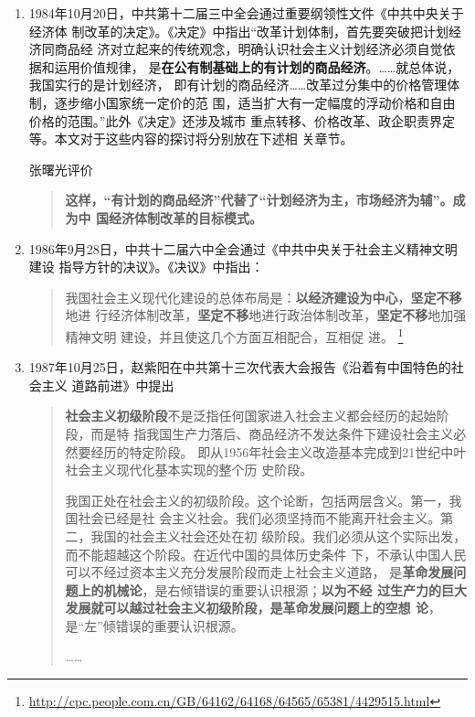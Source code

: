 \begin{enumerate}
\item 1984年10月20日，中共第十二届三中全会通过重要纲领性文件《中共中央关于经济体
  制改革的决定》。《决定》中指出“改革计划体制，首先要突破把计划经济同商品经
  济对立起来的传统观念，明确认识社会主义计划经济必须自觉依据和运用价值规律，
  是\textbf{在公有制基础上的有计划的商品经济}。……就总体说，我国实行的是计划经济，
  即有计划的商品经济……改革过分集中的价格管理体制，逐步缩小国家统一定价的范
  围，适当扩大有一定幅度的浮动价格和自由价格的范围。”此外《决定》还涉及城市
  重点转移、价格改革、政企职责界定等。本文对于这些内容的探讨将分别放在下述相
  关章节。

  张曙光评价
  \begin{quotation}
    \textbf{这样，“有计划的商品经济”代替了“计划经济为主，市场经济为辅”。成为中
      国经济体制改革的目标模式。}
  \end{quotation}

\item 1986年9月28日，中共十二届六中全会通过《中共中央关于社会主义精神文明建设
  指导方针的决议》。《决议》中指出：
  \begin{quotation}
    我国社会主义现代化建设的总体布局是：\textbf{以经济建设为中心}，\textbf{坚定不移}地进
    行经济体制改革，\textbf{坚定不移}地进行政治体制改革，\textbf{坚定不移}地加强精神文明
    建设，并且使这几个方面互相配合，互相促
    进。
    \footnote{\url{http://cpc.people.com.cn/GB/64162/64168/64565/65381/4429515.html}}
  \end{quotation}

\item 1987年10月25日，赵紫阳在中共第十三次代表大会报告《沿着有中国特色的社会主义
  道路前进》中提出
  \begin{quotation}
    \textbf{社会主义初级阶段}不是泛指任何国家进入社会主义都会经历的起始阶段，而是特
    指我国生产力落后、商品经济不发达条件下建设社会主义必然要经历的特定阶段。
    即从1956年社会主义改造基本完成到21世纪中叶社会主义现代化基本实现的整个历
    史阶段。

    我国正处在社会主义的初级阶段。这个论断，包括两层含义。第一，我国社会已经是社
    会主义社会。我们必须坚持而不能离开社会主义。第二，我国的社会主义社会还处在初
    级阶段。我们必须从这个实际出发，而不能超越这个阶段。在近代中国的具体历史条件
    下，不承认中国人民可以不经过资本主义充分发展阶段而走上社会主义道路，
    是\textbf{革命发展问题上的机械论}，是右倾错误的重要认识根源；\textbf{以为不经
      过生产力的巨大发展就可以越过社会主义初级阶段，是革命发展问题上的空想
      论}，是“左”倾错误的重要认识根源。

    ……


\end{quotation}
\end{enumerate}
